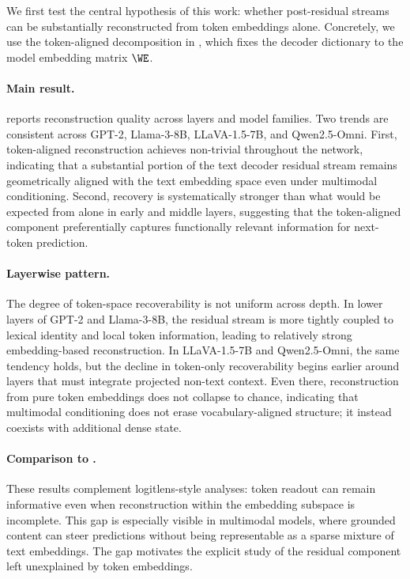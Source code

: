 \documentclass{article}
\begin{document}
We first test the central hypothesis of this work: whether post-residual streams can be substantially reconstructed from token embeddings alone.
Concretely, we use the token-aligned decomposition in , which fixes the decoder dictionary to the model embedding matrix $\WE$.

\paragraph{Main result.}
 reports reconstruction quality across layers and model families.
Two trends are consistent across GPT-2, Llama-3-8B, LLaVA-1.5-7B, and Qwen2.5-Omni.
First, token-aligned reconstruction achieves non-trivial  throughout the network, indicating that a substantial portion of the text decoder residual stream remains geometrically aligned with the text embedding space even under multimodal conditioning.
Second,  recovery is systematically stronger than what would be expected from  alone in early and middle layers, suggesting that the token-aligned component preferentially captures functionally relevant information for next-token prediction.

\paragraph{Layerwise pattern.}
The degree of token-space recoverability is not uniform across depth.
In lower layers of GPT-2 and Llama-3-8B, the residual stream is more tightly coupled to lexical identity and local token information, leading to relatively strong embedding-based reconstruction.
In LLaVA-1.5-7B and Qwen2.5-Omni, the same tendency holds, but the decline in token-only recoverability begins earlier around layers that must integrate projected non-text context.
Even there, reconstruction from pure token embeddings does not collapse to chance, indicating that multimodal conditioning does not erase vocabulary-aligned structure; it instead coexists with additional dense state.

\paragraph{Comparison to .}
These results complement \gls{logitlens}-style analyses: token readout can remain informative even when reconstruction within the embedding subspace is incomplete. This gap is especially visible in multimodal models, where grounded content can steer predictions without being representable as a sparse mixture of text embeddings. The gap motivates the explicit study of the residual component left unexplained by token embeddings.
\end{document}
